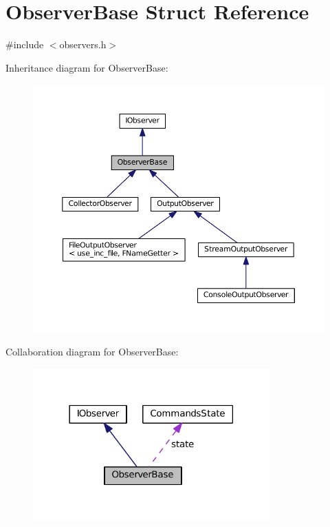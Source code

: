 \hypertarget{struct_observer_base}{}\section{Observer\+Base Struct Reference}
\label{struct_observer_base}


{\ttfamily \#include $<$observers.\+h$>$}



Inheritance diagram for Observer\+Base\+:
\nopagebreak
\begin{figure}[H]
\begin{center}
\leavevmode
\includegraphics[width=350pt]{struct_observer_base__inherit__graph}
\end{center}
\end{figure}


Collaboration diagram for Observer\+Base\+:
\nopagebreak
\begin{figure}[H]
\begin{center}
\leavevmode
\includegraphics[width=258pt]{struct_observer_base__coll__graph}
\end{center}
\end{figure}
